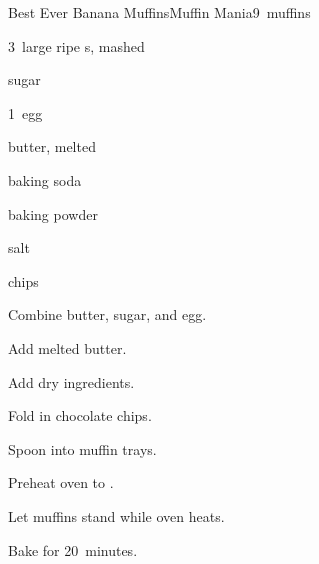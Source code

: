 \begin{recipe}{Best Ever Banana Muffins}{Muffin Mania}{9~muffins}

\begin{ingredients}
\item 3~large ripe s, mashed
\item \C{\threequarter} sugar
\item 1~egg
\item \C{\third} butter, melted
\item {} baking soda
\item {} baking powder
\item \tp{\half} salt
\item \C{1\half}  chips
\end{ingredients}

\begin{directions}
\item Combine butter, sugar, and egg.
\item Add melted butter.
\item Add dry ingredients.
\item Fold in chocolate chips.
\item Spoon into muffin trays.
\item Preheat oven to .
\item Let muffins stand while oven heats.
\item Bake for 20~minutes.
\end{directions}

\hint{}
\end{recipe}

